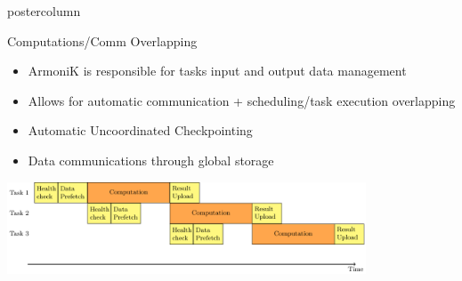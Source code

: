 \begin{frame}[fragile]
\begin{columns}
\begin{column}{.49\textwidth}
\begin{beamercolorbox}[center,wd=\textwidth]{postercolumn}
\begin{minipage}[T]{.95\textwidth}
{            \begin{block}{Computations/Comm Overlapping}
                \begin{itemize}
                \item ArmoniK is responsible for tasks input and output data management
                \item Allows for automatic communication + scheduling/task execution overlapping
                \item Automatic Uncoordinated Checkpointing
                \item Data communications through global storage
                \end{itemize}
                \vspace{3ex}
                \includegraphics[width=0.8\textwidth]{armonik_pipelining.pdf}
            \end{block}


}
\end{minipage}
\end{beamercolorbox}
\end{column}
\end{columns}
\end{frame}
